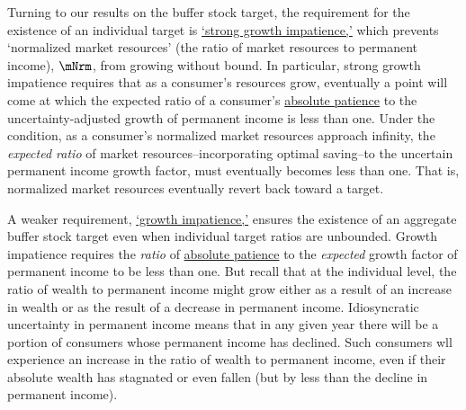 \documentclass[BufferStockTheory]{subfiles}
\begin{document}
% 

Turning to our results on the buffer stock target, the requirement for the existence of an individual target is \hyperlink{GICMod}{`strong growth impatience,'} which prevents `normalized market resources' (the ratio of market resources to permanent income), $\mNrm$, from growing without bound.
In particular, strong growth impatience requires that as a consumer's resources grow, eventually a point will come at which the expected ratio of a consumer's \hyperlink{APFAC}{absolute patience} to the uncertainty-adjusted growth of permanent income is less than one.
Under the condition, as a consumer's normalized market resources approach infinity, the \textit{expected ratio} of market resources--incorporating optimal saving--to the uncertain permanent income growth factor, must eventually becomes less than one.
That is, normalized market resources eventually revert back toward a target.

% 


A weaker requirement, \hyperlink{GIC}{`growth impatience,'} ensures the existence of an aggregate buffer stock target even when individual target ratios are unbounded.
Growth impatience requires the \textit{ratio} of \hyperlink{APFacDefn}{absolute patience} to the \textit{expected} growth factor of permanent income to be less than one.
But recall that at the individual level, the ratio of wealth to permanent income might grow either as a result of an increase in wealth or as the result of a decrease in permanent income.
Idiosyncratic uncertainty in permanent income means that in any given year there will be a portion of consumers whose permanent income has declined.
Such consumers wll experience an increase  in the ratio of wealth to permanent income, even if their absolute wealth has stagnated or even fallen (but by less than the decline in permanent income).
\end{document}
